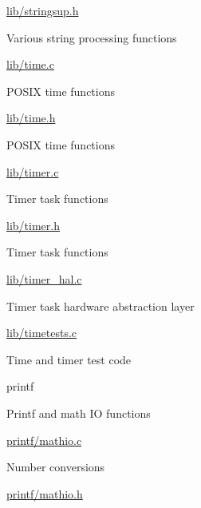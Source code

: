 \begin{DoxyItemize}
\begin{DoxyItemize}
\item \hyperlink{stringsup_8h}{lib/stringsup.\+h}
\begin{DoxyItemize}
\item Various string processing functions
\end{DoxyItemize}
\item \hyperlink{time_8c}{lib/time.\+c}
\begin{DoxyItemize}
\item P\+O\+S\+IX time functions
\end{DoxyItemize}
\item \hyperlink{time_8h}{lib/time.\+h}
\begin{DoxyItemize}
\item P\+O\+S\+IX time functions
\end{DoxyItemize}
\item \hyperlink{timer_8c}{lib/timer.\+c}
\begin{DoxyItemize}
\item Timer task functions
\end{DoxyItemize}
\item \hyperlink{timer_8h}{lib/timer.\+h}
\begin{DoxyItemize}
\item Timer task functions
\end{DoxyItemize}
\item \hyperlink{timer__hal_8c}{lib/timer\+\_\+hal.\+c}
\begin{DoxyItemize}
\item Timer task hardware abstraction layer
\end{DoxyItemize}
\item \hyperlink{timetests_8c}{lib/timetests.\+c}
\begin{DoxyItemize}
\item Time and timer test code
\end{DoxyItemize}
\end{DoxyItemize}
\item printf
\begin{DoxyItemize}
\item Printf and math IO functions
\item \hyperlink{mathio_8c}{printf/mathio.\+c}
\begin{DoxyItemize}
\item Number conversions
\end{DoxyItemize}
\item \hyperlink{mathio_8h}{printf/mathio.\+h}
\begin{DoxyItemize}

\end{DoxyItemize}
\end{DoxyItemize}
\end{DoxyItemize}
